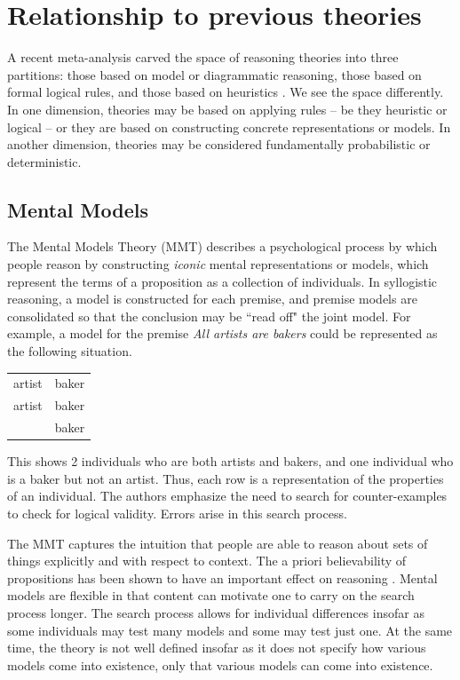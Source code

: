 \documentclass[10pt,letterpaper]{article}
\begin{document}
\section{Relationship to previous theories}

A recent meta-analysis carved the space of reasoning theories into three partitions: those based on model or diagrammatic reasoning, those based on formal logical rules, and those based on heuristics \cite{Khemlani2012}. We see the space differently. In one dimension, theories may be based on applying rules -- be they heuristic or logical -- or they are based on constructing concrete representations or models. In another dimension, theories may be considered fundamentally probabilistic or deterministic. 

\subsection{Mental Models}
 The Mental Models Theory (MMT) describes a psychological process by which people reason by constructing {\em iconic} mental representations or models, which represent the terms of a proposition as a collection of individuals. In syllogistic reasoning, a model is constructed for each premise, and premise models are consolidated so that the conclusion may be ``read off" the joint model. For example, a model for the premise  \emph{All artists are bakers} could be represented as the following situation.

\begin{tabular}{l l}
artist & baker\\
artist & baker\\
 & baker\\
\end{tabular}

This shows 2 individuals who are both artists and bakers, and one individual who is a baker but not an artist. Thus, each row is a representation of the properties of an individual. The authors emphasize the need to search for counter-examples to check for logical validity. Errors arise in this search process.

The MMT captures the intuition that people are able to reason about sets of things explicitly and with respect to context.  The a priori believability of propositions has been shown to have an important effect on reasoning \cite{Oakhill1989}. Mental models are flexible in that content can motivate one to carry on the search process longer. The search process allows for individual differences insofar as some individuals may test many models and some may test just one. At the same time, the theory is not well defined insofar as it does not specify how various models come into existence, only that various models can come into existence.
\end{document}
